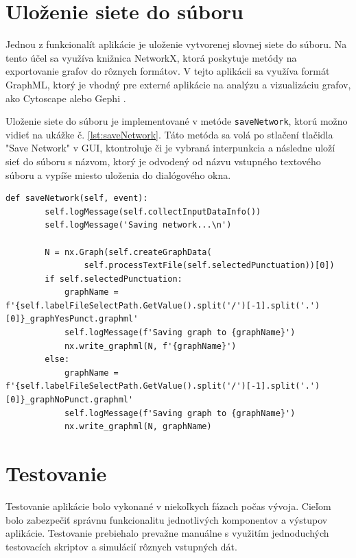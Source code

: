 \section{Uloženie siete do súboru}\label{sec:savingNetworkToFile}

Jednou z funkcionalít aplikácie je uloženie vytvorenej slovnej siete do súboru. Na tento účel sa využíva knižnica NetworkX,
ktorá poskytuje metódy na exportovanie grafov do rôznych formátov. V tejto aplikácii sa využíva formát GraphML, ktorý je
vhodný pre externé aplikácie na analýzu a vizualizáciu grafov, ako Cytoscape \cite{cytoscape_website}
alebo Gephi \cite{gephi_website}. 

Uloženie siete do súboru je implementované v metóde \texttt{saveNetwork}, ktorú možno
vidieť na ukážke č. \ref{lst:saveNetwork}. Táto metóda sa volá po stlačení tlačidla "Save Network" v GUI, ktontroluje či je vybraná
interpunkcia a následne uloží sieť do súboru s názvom, ktorý je odvodený od názvu vstupného textového súboru a vypíše miesto uloženia
do dialógového okna.

\pagebreak

\begin{lstlisting}[caption={Uloženie siete do súboru.}, label={lst:saveNetwork}]
    def saveNetwork(self, event):
        self.logMessage(self.collectInputDataInfo())
        self.logMessage('Saving network...\n')

        N = nx.Graph(self.createGraphData(
                self.processTextFile(self.selectedPunctuation))[0])
        if self.selectedPunctuation:
            graphName = f'{self.labelFileSelectPath.GetValue().split('/')[-1].split('.')[0]}_graphYesPunct.graphml'
            self.logMessage(f'Saving graph to {graphName}')
            nx.write_graphml(N, f'{graphName}')
        else:
            graphName = f'{self.labelFileSelectPath.GetValue().split('/')[-1].split('.')[0]}_graphNoPunct.graphml'
            self.logMessage(f'Saving graph to {graphName}')
            nx.write_graphml(N, graphName)
\end{lstlisting}


\section{Testovanie}\label{sec:testing}

Testovanie aplikácie bolo vykonané v niekoľkych fázach počas vývoja. Cieľom bolo zabezpečiť správnu funkcionalitu jednotlivých
komponentov a výstupov aplikácie. Testovanie prebiehalo prevažne manuálne s využitím jednoduchých testovacích skriptov
a simulácií rôznych vstupných dát.

